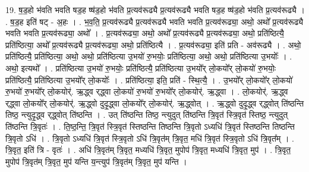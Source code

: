 \documentclass[17pt]{extarticle}
\begin{document}
19. ष॒ड॒हो भ॑वति भवति षड॒ह ष्ष॑ड॒हो भ॑वति प्र॒त्यव॑रूढ्यै प्र॒त्यव॑रूढ्यै भवति षड॒ह ष्ष॑ड॒हो भ॑वति प्र॒त्यव॑रूढ्यै । . ष॒ड॒ह इति॑ षट् - अ॒हः । . भ॒व॒ति॒ प्र॒त्यव॑रूढ्यै प्र॒त्यव॑रूढ्यै भवति भवति प्र॒त्यव॑रूढ्या॒ अथो॒ अथो᳚ प्र॒त्यव॑रूढ्यै भवति भवति प्र॒त्यव॑रूढ्या॒ अथो᳚ । . प्र॒त्यव॑रूढ्या॒ अथो॒ अथो᳚ प्र॒त्यव॑रूढ्यै प्र॒त्यव॑रूढ्या॒ अथो॒ प्रति॑ष्ठित्यै॒ प्रति॑ष्ठित्या॒ अथो᳚ प्र॒त्यव॑रूढ्यै प्र॒त्यव॑रूढ्या॒ अथो॒ प्रति॑ष्ठित्यै । . प्र॒त्यव॑रूढ्या॒ इति॑ प्रति - अव॑रूढ्यै । . अथो॒ प्रति॑ष्ठित्यै॒ प्रति॑ष्ठित्या॒ अथो॒ अथो॒ प्रति॑ष्ठित्या उ॒भयो॑ रु॒भयोः॒ प्रति॑ष्ठित्या॒ अथो॒ अथो॒ प्रति॑ष्ठित्या उ॒भयोः᳚ । . अथो॒ इत्यथो᳚ । . प्रति॑ष्ठित्या उ॒भयो॑ रु॒भयोः॒ प्रति॑ष्ठित्यै॒ प्रति॑ष्ठित्या उ॒भयो᳚र् लो॒कयो᳚र् लो॒कयो॑ रु॒भयोः॒ प्रति॑ष्ठित्यै॒ प्रति॑ष्ठित्या उ॒भयो᳚र् लो॒कयोः᳚ । . प्रति॑ष्ठित्या॒ इति॒ प्रति॑ - स्थि॒त्यै॒ । . उ॒भयो᳚र् लो॒कयो᳚र् लो॒कयो॑ रु॒भयो॑ रु॒भयो᳚र् लो॒कयोर्॑. ऋ॒द्ध्व र्‌द्ध्वा लो॒कयो॑ रु॒भयो॑ रु॒भयो᳚र् लो॒कयोर्॑. ऋ॒द्ध्वा । . लो॒कयोर्॑. ऋ॒द्ध्व र्‌द्ध्वा लो॒कयो᳚र् लो॒कयोर्॑. ऋ॒द्ध्वो दुदृ॒द्ध्वा लो॒कयो᳚र् लो॒कयोर्॑. ऋ॒द्ध्वोत् । . ऋ॒द्ध्वो दुदृ॒द्ध्व र्‌द्ध्वोत् ति॑ष्ठन्ति तिष्ठ॒ न्त्युदृ॒द्ध्व र्‌द्ध्वोत् ति॑ष्ठन्ति । . उत् ति॑ष्ठन्ति तिष्ठ॒ न्त्युदुत् ति॑ष्ठन्ति त्रि॒वृत॑ स्त्रि॒वृत॑ स्तिष्ठ॒ न्त्युदुत् ति॑ष्ठन्ति त्रि॒वृतः॑ । . ति॒ष्ठ॒न्ति॒ त्रि॒वृत॑ स्त्रि॒वृत॑ स्तिष्ठन्ति तिष्ठन्ति त्रि॒वृतो ऽध्यधि॑ त्रि॒वृत॑ स्तिष्ठन्ति तिष्ठन्ति त्रि॒वृतो ऽधि॑ । . त्रि॒वृतो ऽध्यधि॑ त्रि॒वृत॑ स्त्रि॒वृतो ऽधि॑ त्रि॒वृत॑म् त्रि॒वृत॒ मधि॑ त्रि॒वृत॑ स्त्रि॒वृतो ऽधि॑ त्रि॒वृत᳚म् । . त्रि॒वृत॒ इति॑ त्रि - वृतः॑ । . अधि॑ त्रि॒वृत॑म् त्रि॒वृत॒ मध्यधि॑ त्रि॒वृत॒ मुपोप॑ त्रि॒वृत॒ मध्यधि॑ त्रि॒वृत॒ मुप॑ । . त्रि॒वृत॒ मुपोप॑ त्रि॒वृत॑म् त्रि॒वृत॒ मुप॑ यन्ति य॒न्त्युप॑ त्रि॒वृत॑म् त्रि॒वृत॒ मुप॑ यन्ति । \newline
\end{document}
